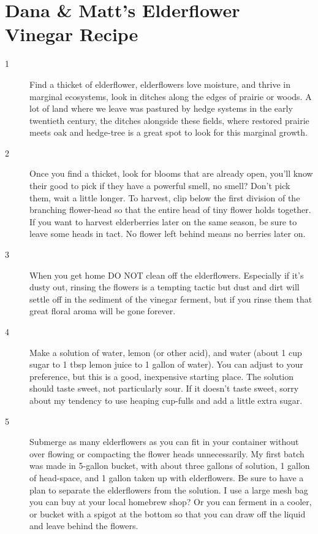 \documentclass[10pt,a6paper,footinclude=false,firstfoot=false,headinclude=true,open=any,DIV=6]{scrbook} %
\begin{document}
\section*{Dana \& Matt's Elderflower Vinegar Recipe}

\begin{description}
\item [1] Find a thicket of elderflower, elderflowers love moisture, and thrive in marginal ecosystems, look in ditches along the edges of prairie or woods. A lot of land where we leave was pastured by hedge systems in the early twentieth century, the ditches alongside these fields, where restored prairie meets oak and hedge-tree is a great spot to look for this marginal growth.
\item [2] Once you find a thicket, look for blooms that are already open, you'll know their good to pick if they have a powerful smell, no smell? Don't pick them, wait a little longer. To harvest, clip below the first division of the branching flower-head so that the entire head of tiny flower holds together. If you want to harvest elderberries later on the same season, be sure to leave some heads in tact. No flower left behind means no berries later on.
\item [3] When you get home DO NOT clean off the elderflowers. Especially if it's dusty out, rinsing the flowers is a tempting tactic but dust and dirt will settle off in the sediment of the vinegar ferment, but if you rinse them that great floral aroma will be gone forever.
\item [4] Make a solution of water, lemon (or other acid), and water (about 1 cup sugar to 1 tbsp lemon juice to 1 gallon of water). You can adjust to your preference, but this is a good, inexpensive starting place. The solution should taste sweet, not particularly sour. If it doesn't taste sweet, sorry about my tendency to use heaping cup-fulls and add a little extra sugar.
\item [5] Submerge as many elderflowers as you can fit in your container without over flowing or compacting the flower heads unnecessarily. My first batch was made in 5-gallon bucket, with about three gallons of solution, 1 gallon of head-space, and 1 gallon taken up with elderflowers. Be sure to have a plan to separate the elderflowers from the solution. I use a large mesh bag you can buy at your local homebrew shop? Or you can ferment in a cooler, or bucket with a spigot at the bottom so that you can draw off the liquid and leave behind the flowers.

\end{description}
\end{document}
